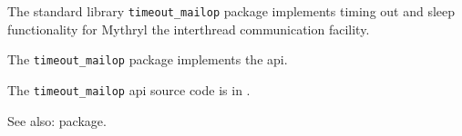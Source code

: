 
The standard library {\tt timeout\_mailop} package implements timing out and sleep functionality for Mythryl the interthread communication facility.

The {\tt timeout\_mailop} package implements the  api.

The {\tt timeout\_mailop} api source code is in .

See also:  package.



